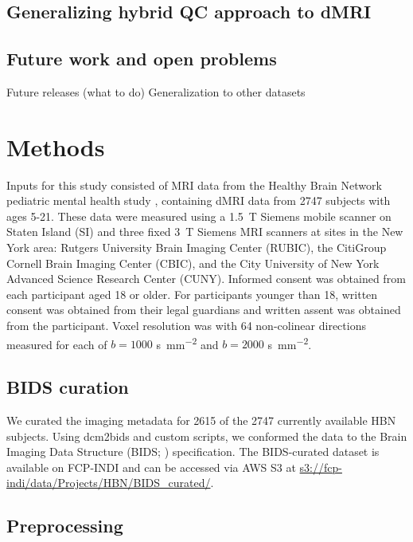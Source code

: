 \documentclass[fleqn,10pt]{wlscirep}
\begin{document}
\subsection*{Generalizing hybrid QC approach to dMRI}

\subsection*{Future work and open problems}

Future releases (what to do)
Generalization to other datasets

\section*{Methods}

Inputs for this study consisted of MRI data from the Healthy Brain Network
pediatric mental health study \cite{alexander2017-yc}, containing dMRI data from
\num{2747} subjects with ages 5-21. These data were measured using a
\qty{1.5}{\tesla} Siemens mobile scanner on Staten Island (SI) and three fixed
\qty{3}{\tesla} Siemens MRI scanners at sites in the New York area: Rutgers
University Brain Imaging Center (RUBIC), the CitiGroup Cornell Brain Imaging
Center (CBIC), and the City University of New York Advanced Science Research
Center (CUNY). Informed consent was obtained from each participant aged 18 or
older. For participants younger than 18, written consent was obtained from their
legal guardians and written assent was obtained from the participant. Voxel
resolution was  with \num{64} non-colinear
directions measured for each of $b=1000$ \unit{\second \per \mm^{2}} and
$b=2000$ \unit{\second \per \mm^{2}}.

\subsection*{BIDS curation}

We curated the imaging metadata for \num{2615} of the \num{2747} currently
available HBN subjects. Using dcm2bids and custom scripts, we conformed the data
to the Brain Imaging Data Structure (BIDS; \cite{gorgolewski2016-lh})
specification.  The BIDS-curated dataset is available on FCP-INDI and can be
accessed via AWS S3 at \url{s3://fcp-indi/data/Projects/HBN/BIDS_curated/}.


\subsection*{Preprocessing}
\end{document}
